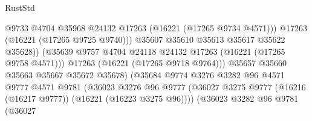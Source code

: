 \begin{lexlean}{RustStd}
\begin{coremodule}
                                                @9733
                                                @4704
                                                @35968
                                                @24132
                                                @17263
                                                (@16221 (@17265 @9734 @4571)))
                                              @17263
                                              (@16221 (@17265 @9725 @9740)))
                                            @35607
                                            @35610
                                            @35613
                                            @35617
                                            @35622
                                            @35628))
                                        (@35639
                                          @9757
                                          @4704
                                          @24118
                                          @24132
                                          @17263
                                          (@16221 (@17265 @9758 @4571)))
                                        @17263
                                        (@16221 (@17265 @9718 @9764)))
                                      @35657
                                      @35660
                                      @35663
                                      @35667
                                      @35672
                                      @35678)
                                    (@35684
                                      @9774
                                      @3276
                                      @3282
                                      @96
                                      @4571
                                      @9777
                                      @4571
                                      @9781
                                      (@36023
                                        @3276
                                        @96
                                        @9777
                                        (@36027
                                          @3275
                                          @9777
                                          (@16216 (@16217 @9777))
                                          (@16221 (@16223 @3275 @96))))
                                      (@36023
                                        @3282
                                        @96
                                        @9781
                                        (@36027

\end{coremodule}
\end{lexlean}
